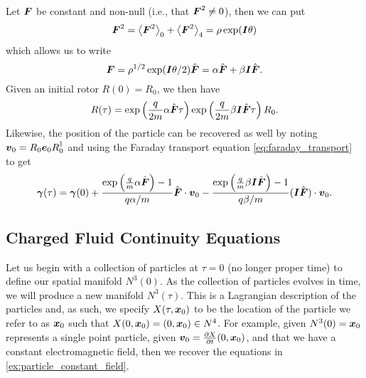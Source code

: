 \documentclass[conf]{new-aiaa}
\begin{document}
\begin{example}
\label{ex:particle_constant_field}
Let $\blade{F}$ be constant and non-null (i.e., that $\blade{F}^2\neq 0$), then we can put
\begin{equation}
\blade{F}^2 = \proj{0}{\blade{F}^2}+\proj{4}{\blade{F}^2}=\rho \exp(\blade{I}\theta)
\end{equation}
which allows us to write 
\begin{equation}
\blade{F}=\rho^{1/2}\exp(\blade{I}\theta/2)\hat{\blade{F}}=\alpha \hat{\blade{F}}+\beta\blade{I} \hat{\blade{F}}.
\end{equation}
Given an initial rotor $R(0)=R_0$, we then have
\begin{equation}
R(\tau)=\exp\left(\frac{q}{2m}\alpha \hat{\blade{F}}\tau\right)\exp\left(\frac{q}{2m}\beta\blade{I}\hat{\blade{F}}\tau\right)R_0.
\end{equation}
Likewise, the position of the particle can be recovered as well by noting $\blade{v}_0=R_0\blade{e}_0 R_0^\dagger$ and using the Faraday transport equation \cref{eq:faraday_transport} to get
\begin{equation}
\blade{\gamma}(\tau) = \blade{\gamma}(0)+\frac{\exp\left(\frac{q}{m}\alpha \hat{\blade{F}}\right)-1}{q\alpha/m} \hat{\blade{F}}\cdot \blade{v}_0 - \frac{\exp\left(\frac{q}{m}\beta \blade{I}\hat{\blade{F}}\right)-1}{q\beta/m}(\blade{I}\hat{\blade{F}})\cdot \blade{v}_0.
\end{equation}
\end{example}


\subsection{Charged Fluid Continuity Equations}
\label{subsec:charged_fluid}

Let us begin with a collection of particles at $\tau=0$ (no longer proper time) to define our spatial manifold $N^3(0)$. As the collection of particles evolves in time, we will produce a new manifold $N^3(\tau)$. This is a Lagrangian description of the particles and, as such, we specify $X(\tau, \blade{x}_0)$ to be the location of the particle we refer to as $\blade{x}_0$ such that $X(0,\blade{x}_0)=(0,\blade{x}_0)\in N^4$. For example, given $N^3(0)=\blade{x}_0$ represents a single point particle, given $\blade{v}_0=\frac{\partial X}{\partial t}(0,\blade{x}_0)$, and that we have a constant electromagnetic field, then we recover the equations in \cref{ex:particle_constant_field}.
\end{document}
